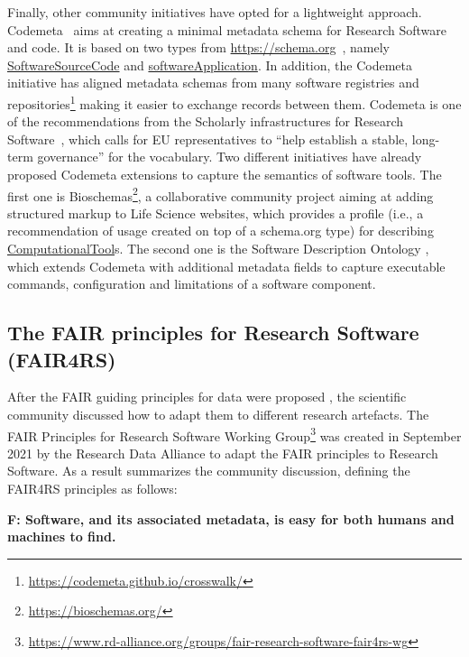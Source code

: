Finally, other community initiatives have opted for a lightweight approach. Codemeta~\cite{Boettigeral2017} aims at creating a minimal metadata schema for Research Software and code. It is based on two types from \url{https://schema.org}~\cite{guha_schemaorg_2016}, namely \href{https://schema.org/SoftwareSourceCode}{SoftwareSourceCode} and \href{https://schema.org/SoftwareApplication}{softwareApplication}. In addition, the Codemeta initiative has aligned metadata schemas from many software registries and repositories\footnote{\url{https://codemeta.github.io/crosswalk/}} making it easier to exchange records between them. Codemeta is one of the recommendations from the Scholarly infrastructures for Research Software~\cite{sirs_2019}, which calls for EU representatives to ``help establish a stable, long-term governance'' for the vocabulary. Two different initiatives have already proposed Codemeta extensions to capture the semantics of software tools. The first one is Bioschemas\footnote{\url{https://bioschemas.org/}}, a collaborative community project aiming at adding structured markup to Life Science websites, which provides a profile (i.e., a recommendation of usage created on top of a schema.org type) for describing \href{https://bioschemas.org/profiles/ComputationalTool}{ComputationalTool}s. The second one is the Software Description Ontology \cite{garijo2019okg}, which extends Codemeta with additional metadata fields to capture executable commands, configuration and limitations of a software component. 

\subsection{The FAIR principles for Research Software (FAIR4RS)}
\label{subsec:fair4rs}

After the FAIR guiding principles for data were proposed \cite{wilkinson_fair_2016}, the scientific community discussed how to adapt them to different research artefacts. The FAIR Principles for Research Software Working Group\footnote{\url{https://www.rd-alliance.org/groups/fair-research-software-fair4rs-wg}} was created in September 2021 by the Research Data Alliance to adapt the FAIR principles to Research Software. As a result \cite{chue_hong_neil_p_2022_6623556} summarizes the community discussion, defining the FAIR4RS principles as follows:

\textbf{F: Software, and its associated metadata, is easy for both humans and machines to find.}

